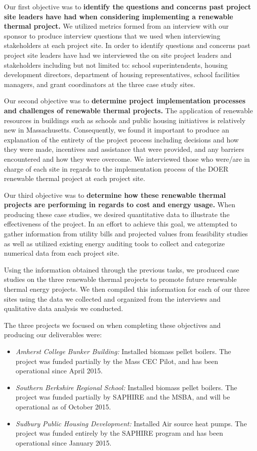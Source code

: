 \par Our first objective was to \textbf{identify the questions and concerns past project site leaders have had when considering implementing a renewable thermal project.} We utilized metrics formed from an interview with our sponsor to produce interview questions that we used when interviewing stakeholders at each project site. In order to identify questions and concerns past project site leaders have had we interviewed the on site project leaders and stakeholders including but not limited to: school superintendents, housing development directors, department of housing representatives, school facilities managers, and grant coordinators at the three case study sites.
\par Our second objective was to \textbf{determine project implementation processes and challenges of renewable thermal projects.} The application of renewable resources in buildings such as schools and public housing initiatives is relatively new in Massachusetts. Consequently, we found it important to produce an explanation of the entirety of the project process including decisions and how they were made, incentives and assistance that were provided, and any barriers encountered and how they were overcome. We interviewed those who were/are in charge of each site in regards to the implementation process of the DOER renewable thermal project at each project site.
\par Our third objective was to \textbf{determine how these renewable thermal projects are performing in regards to cost and energy usage.} When producing these case studies, we desired quantitative data to illustrate the effectiveness of the project. In an effort to achieve this goal, we attempted to gather information from utility bills and projected values from feasibility studies as well as utilized existing energy auditing tools to collect and categorize numerical data from each project site.
\par Using the information obtained through the previous tasks, we produced case studies on the three renewable thermal projects to promote future renewable thermal energy projects. We then compiled this information for each of our three sites using the data we collected and organized from the interviews and qualitative data analysis we conducted.

\noindent
The three projects we focused on when completing these objectives and producing our deliverables were:
\begin{itemize}
  \item{\emph{Amherst College Bunker Building:} Installed biomass pellet boilers. The project was funded partially by the Mass CEC Pilot, and has been operational since April 2015.}
  \item{\emph{Southern Berkshire Regional School:} Installed biomass pellet boilers. The project was funded partially by SAPHIRE and the MSBA, and will be operational as of October 2015.}
  \item{\emph{Sudbury Public Housing Development:} Installed Air source heat pumps. The project was funded entirely by the SAPHIRE program and has been operational since January 2015.}
\end{itemize}

